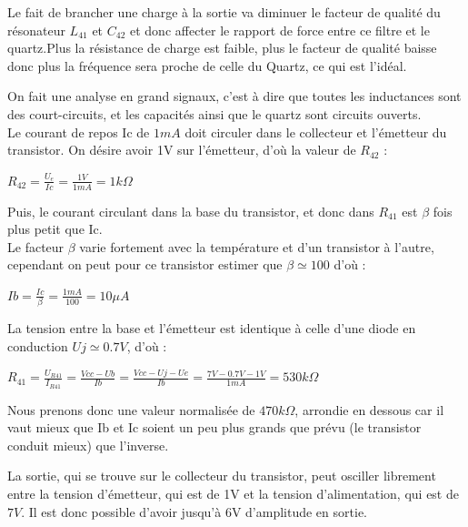 \documentclass{article}
\begin{document}

Le fait de brancher une charge à la sortie va diminuer le facteur de qualité du résonateur $L_{41}$ et $C_{42}$ et donc affecter le rapport de force entre ce filtre et le quartz.Plus la résistance de charge est faible, plus le facteur de qualité baisse donc plus la fréquence sera proche de celle du Quartz, ce qui est l'idéal.


On fait une analyse en grand signaux, c'est à dire que toutes les inductances sont des court-circuits, et les capacités ainsi que le quartz sont circuits ouverts.\\
Le courant de repos Ic de $1mA$ doit circuler dans le collecteur et l'émetteur du transistor. On désire avoir 1V sur l'émetteur, d'où la valeur de $R_{42}$ :
\begin{center}
$R_{42} = \frac{U_e}{Ic} = \frac{1V}{1mA} = 1k\Omega$
\end{center}
Puis, le courant circulant dans la base du transistor, et donc dans $R_{41}$ est $\beta$ fois plus petit que Ic.\\
Le facteur $\beta$ varie fortement avec la température et d'un transistor à l'autre, cependant on peut pour ce transistor estimer que $\beta \simeq 100$ d'où :
\begin{center}
$Ib = \frac{Ic}{\beta} = \frac{1mA}{100} = 10\mu A$
\end{center}
La tension entre la base et l'émetteur est identique à celle d'une diode en conduction $Uj \simeq 0.7V$, d'où :
\begin{center}
$R_{41} = \frac{U_{R41}}{I_{R41}} = \frac{Vcc - Ub}{Ib} = \frac{Vcc - Uj - Ue}{Ib} = \frac{7V - 0.7V - 1V}{1mA} = 530k\Omega$
\end{center}
Nous prenons donc une valeur normalisée de $470k\Omega$, arrondie en dessous car il vaut mieux que Ib et Ic soient un peu plus grands que prévu (le transistor conduit mieux) que l'inverse.\\


La sortie, qui se trouve sur le collecteur du transistor, peut osciller librement entre la tension d'émetteur, qui est de 1V et la tension d'alimentation, qui est de $7V$. Il est donc possible d'avoir jusqu'à 6V d'amplitude en sortie.\\
\end{document}
